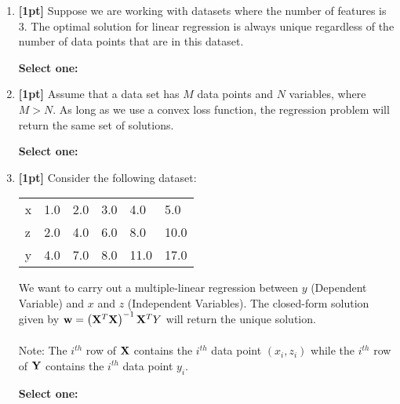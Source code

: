 \begin{enumerate}
    

    \item \textbf{[1pt]} Suppose we are working with datasets where the number of features is 3. The optimal solution for linear regression is always unique regardless of the number of data points that are in this dataset.
    
    \textbf{Select one:}
    
    
    \item \textbf{[1pt]} Assume that a data set has $M$ data points and $N$ variables, where $M>N$. As long as we use a convex loss function, the regression problem will return the same set of solutions.
    
    \textbf{Select one:}
    
    
    \newpage
    \item \textbf{[1pt]} Consider the following dataset:
        \begin{table}[H]
    \centering
        \begin{tabular}{llllll}
        x & 1.0 & 2.0 & 3.0 & 4.0 & 5.0 \\
        z & 2.0 & 4.0 & 6.0 & 8.0 & 10.0 \\
        y & 4.0 & 7.0 & 8.0 & 11.0 & 17.0
        \end{tabular}
    \end{table}
   We want to carry out a multiple-linear regression between $y$ (Dependent Variable) and $x$ and $z$ (Independent Variables). The closed-form solution given by $\mathbf{w} = \left(\mathbf{X}^T\mathbf{X}\right)^{-1}\mathbf{X}^T Y$ will return the unique solution. 
    \\~\\
    Note: The $i^{th}$ row of $\mathbf{X}$ contains the $i^{th}$ data point $(x_i,z_i)$ while the $i^{th}$ row of $\mathbf{Y}$ contains the $i^{th}$ data point $y_i$. 
    
        \textbf{Select one:}
    


\end{enumerate}
